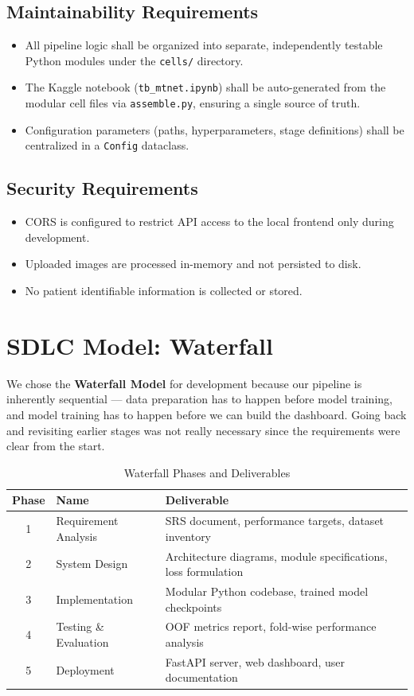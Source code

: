 \documentclass[12pt]{report}
\begin{document}
\subsection{Maintainability Requirements}
\begin{itemize}
    \item All pipeline logic shall be organized into separate, independently testable Python modules under the \texttt{cells/} directory.
    \item The Kaggle notebook (\texttt{tb\_mtnet.ipynb}) shall be auto-generated from the modular cell files via \texttt{assemble.py}, ensuring a single source of truth.
    \item Configuration parameters (paths, hyperparameters, stage definitions) shall be centralized in a \texttt{Config} dataclass.
\end{itemize}

\subsection{Security Requirements}
\begin{itemize}
    \item CORS is configured to restrict API access to the local frontend only during development.
    \item Uploaded images are processed in-memory and not persisted to disk.
    \item No patient identifiable information is collected or stored.
\end{itemize}

\section{SDLC Model: Waterfall}

We chose the \textbf{Waterfall Model} for development because our pipeline is inherently sequential --- data preparation has to happen before model training, and model training has to happen before we can build the dashboard. Going back and revisiting earlier stages was not really necessary since the requirements were clear from the start.

\begin{table}[H]
\centering
\caption{Waterfall Phases and Deliverables}
\renewcommand{\arraystretch}{1.2}
\begin{tabular}{|c|l|p{6cm}|}
\hline
\textbf{Phase} & \textbf{Name} & \textbf{Deliverable} \\
\hline
1 & Requirement Analysis & SRS document, performance targets, dataset inventory \\
2 & System Design & Architecture diagrams, module specifications, loss formulation \\
3 & Implementation & Modular Python codebase, trained model checkpoints \\
4 & Testing \& Evaluation & OOF metrics report, fold-wise performance analysis \\
5 & Deployment & FastAPI server, web dashboard, user documentation \\
\hline
\end{tabular}
\end{table}
\end{document}
